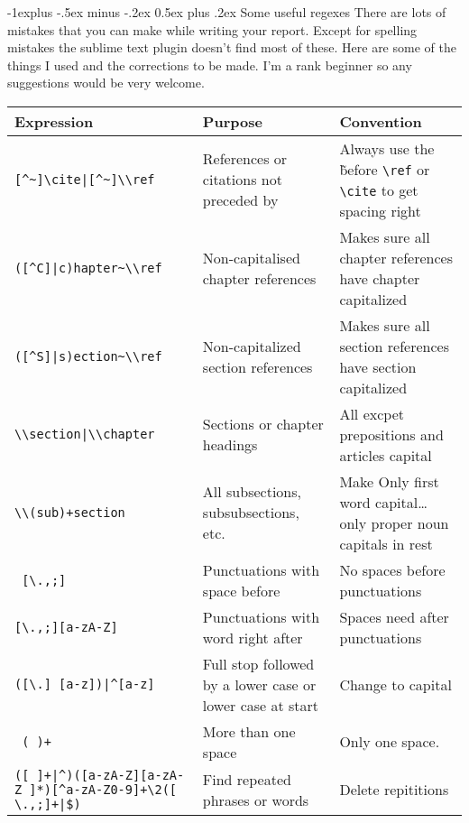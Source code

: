 \documentclass[12pt,landscape]{article}
\makeatletter
\renewcommand{\section}{\@startsection{section}{1}{0mm}%
                                {-1ex plus -.5ex minus -.2ex}%
                                {0.5ex plus .2ex}%
                                {\normalfont\large\bfseries}}
\renewcommand{\subsection}{\@startsection{subsection}{2}{0mm}%
                                {-1explus -.5ex minus -.2ex}%
                                {0.5ex plus .2ex}%
                                {\normalfont\normalsize\bfseries}}
\makeatother
\begin{document}
\subsection{Some useful regexes}
There are lots of mistakes that you can make while writing your report. Except for spelling mistakes the sublime text plugin doesn't find most of these.  Here are some of the things I used and the corrections to be made. I'm a rank beginner so any suggestions would be very welcome.
\\
\vspace{0.25in}
\begin{tabular}{p{4in}  p{2.5in}  p{3in}}
\hline\hline %
Expression                      & Purpose                                       & Convention \\
\hline
\verb![^~]\cite|[^~]\\ref!       & References or citations not preceded by ~     & Always use the \~ before \verb!\ref! or \verb!\cite! to get spacing right \\
\verb!([^C]|c)hapter~\\ref!       & Non-capitalised chapter references            & Makes sure all chapter references have chapter capitalized \\
\verb!([^S]|s)ection~\\ref!      & Non-capitalized section references            & Makes sure all section references have section capitalized \\
\verb!\\section|\\chapter!      & Sections or chapter headings                  & All excpet prepositions and articles capital \\
\verb!\\(sub)+section!          & All subsections, subsubsections, etc.         & Make Only first word capital…  only proper noun capitals in rest \\
\verb! [\.,;]!                  & Punctuations with space before                & No spaces before punctuations \\
\verb![\.,;][a-zA-Z]!           & Punctuations with word right after            & Spaces need after punctuations \\
\verb!([\.] [a-z])|^[a-z]!      & Full stop followed by a lower case or lower case at start & Change to capital \\
\verb! ( )+!                    & More than one space                           & Only one space. \\
\verb!([ ]+|^)([a-zA-Z][a-zA-Z ]*)[^a-zA-Z0-9]+\2([ \.,;]+|$)! & Find repeated phrases or words & Delete repititions
\end{tabular}
\vspace{0.25in}
\end{document}
